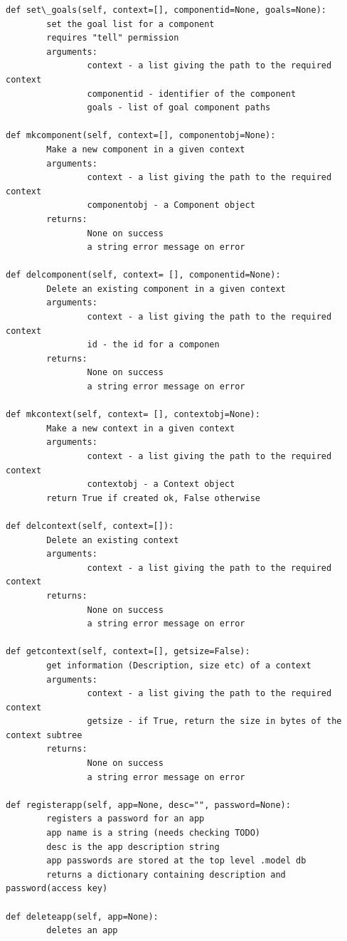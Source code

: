 \documentclass[letterpaper,10pt,english]{sphinxmanual}
\begin{document}
\begin{Verbatim}[commandchars=\\\{\}]
def set\_goals(self, context=[], componentid=None, goals=None):
        set the goal list for a component
        requires "tell" permission
        arguments:
                context - a list giving the path to the required context
                componentid - identifier of the component
                goals - list of goal component paths

def mkcomponent(self, context=[], componentobj=None):
        Make a new component in a given context
        arguments:
                context - a list giving the path to the required context
                componentobj - a Component object
        returns:
                None on success
                a string error message on error

def delcomponent(self, context= [], componentid=None):
        Delete an existing component in a given context
        arguments:
                context - a list giving the path to the required context
                id - the id for a componen
        returns:
                None on success
                a string error message on error

def mkcontext(self, context= [], contextobj=None):
        Make a new context in a given context
        arguments:
                context - a list giving the path to the required context
                contextobj - a Context object
        return True if created ok, False otherwise

def delcontext(self, context=[]):
        Delete an existing context
        arguments:
                context - a list giving the path to the required context
        returns:
                None on success
                a string error message on error

def getcontext(self, context=[], getsize=False):
        get information (Description, size etc) of a context
        arguments:
                context - a list giving the path to the required context
                getsize - if True, return the size in bytes of the context subtree
        returns:
                None on success
                a string error message on error

def registerapp(self, app=None, desc="", password=None):
        registers a password for an app
        app name is a string (needs checking TODO)
        desc is the app description string
        app passwords are stored at the top level .model db
        returns a dictionary containing description and password(access key)

def deleteapp(self, app=None):
        deletes an app


\end{Verbatim}
\end{document}
